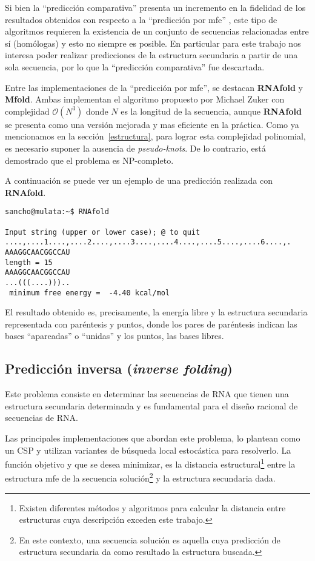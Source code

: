 Si bien la ``predicci\'on comparativa'' presenta un incremento en la fidelidad
de los resultados obtenidos con respecto a la ``predicci\'on por \ac{mfe}''
\cite{Gardner04}, este tipo de algoritmos requieren la existencia de un conjunto
de secuencias relacionadas entre s\'i (hom\'ologas) y esto no siempre es
posible. En particular para este trabajo nos interesa poder realizar
predicciones de la estructura secundaria a partir de una sola secuencia, por lo
que la ``predicci\'on comparativa'' fue descartada.

Entre las implementaciones de la ``predicci\'on por \ac{mfe}'', se destacan
\textbf{RNAfold}\cite{Hofacker94} y \textbf{Mfold}\cite{Zuker81}. Ambas
implementan el algoritmo propuesto por Michael Zuker con complejidad
$\mathcal{O}(N^{3})$ donde $N$ es la longitud de la secuencia, aunque
\textbf{RNAfold} se presenta como una versi\'on mejorada y mas eficiente en la
pr\'actica. Como ya mencionamos en la secci\'on~\ref{estructura}, para lograr
esta complejidad polinomial, es necesario suponer la ausencia de
\textit{pseudo-knots}. De lo contrario, est\'a demostrado que el problema es
NP-completo\cite{Lyngso00}.

A continuaci\'on se puede ver un ejemplo de una predicci\'on realizada con
\textbf{RNAfold}.

\begin{verbatim}
sancho@mulata:~$ RNAfold

Input string (upper or lower case); @ to quit
....,....1....,....2....,....3....,....4....,....5....,....6....,.
AAAGGCAACGGCCAU
length = 15
AAAGGCAACGGCCAU
...(((....)))..
 minimum free energy =  -4.40 kcal/mol
\end{verbatim}

El resultado obtenido es, precisamente, la energ\'ia libre y la estructura
secundaria representada con par\'entesis y puntos, donde los pares de
par\'entesis indican las bases ``apareadas'' o ``unidas'' y los puntos, las
bases libres.

\subsection{Predicci\'on inversa (\textit{inverse folding})}
\label{inverse}
Este problema consiste en determinar las secuencias de \ac{RNA} que tienen una
estructura secundaria determinada y es fundamental para el dise\~no racional de
secuencias de \ac{RNA}.

Las principales implementaciones que abordan este problema, lo plantean como un
\ac{CSP} y utilizan variantes de b\'usqueda local estoc\'astica para
resolverlo. La funci\'on objetivo y que se desea minimizar, es la distancia
estructural\footnote{Existen diferentes m\'etodos y algoritmos para calcular
la distancia entre estructuras cuya descripci\'on exceden este trabajo.}
entre la estructura \ac{mfe} de la secuencia soluci\'on\footnote{En este
contexto, una secuencia soluci\'on es aquella cuya predicci\'on de estructura
secundaria da como resultado la estructura buscada.} y la estructura secundaria
dada. 

